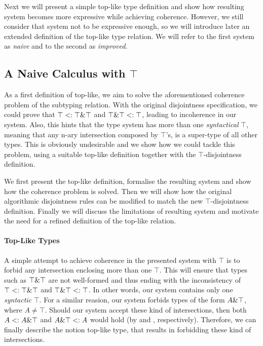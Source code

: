 Next we will present a simple top-like type definition and show how resulting system
becomes more expressive while achieving coherence.
However, we still consider that system not to be expressive enough, 
so we will introduce later an extended definition of the top-like type relation.
We will refer to the first system as \emph{naive} and to the second as \emph{improved}. 

\subsection{A Naive Calculus with $\top$}

As a first definition of top-like, we aim to solve the aforementioned coherence problem of the subtyping relation.
With the original disjointness specification, we could prove that $\top <: \top \& \top$ and $\top \& \top <: \top$, leading to incoherence in our system. 
Also, this hints that the type system has more than one \emph{syntactical} $\top$,
meaning that any n-ary intersection composed by $\top$'s, is a super-type of all other
types.
This is obviously undesirable and we show how we could tackle this problem, using a
suitable top-like definition together with the $\top$-disjointness definition.

We first present the top-like definition, formalise the resulting system and  
show how the coherence problem is solved.
Then we will show how the original algorithmic disjointness rules can be modified to match the new $\top$-disjointness
definition.
Finally we will discuss the limitations of resulting system and motivate the need for a refined definition of the top-like 
relation. 

\paragraph{Top-Like Types}

A simple attempt to achieve coherence in the presented system with $\top$ is to forbid any intersection enclosing 
more than one $\top$.
This will ensure that types such as $\top \& \top$ are not well-formed and thus ending with the inconsistency of
$\top <: \top \& \top$ and $\top \& \top <: \top$.
In other words, our system contains only one \emph{syntactic} $\top$. 
For a similar reasion, our system forbids types of the form $A \& \top$, where $A \neq \top$.  
Should our system accept these kind of intersections, then both $A <: A \& \top$ and 
$A \& \top <: A$ would hold (by  and , respectively).
Therefore, we can finally describe the notion top-like type, that results in forbidding these kind of intersections.

